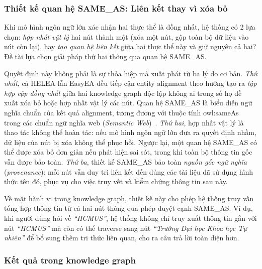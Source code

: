 \subsubsection{Thiết kế quan hệ SAME\_AS: Liên kết thay vì xóa bỏ}
\label{subsubsec:sameas-design}

Khi mô hình ngôn ngữ lớn xác nhận hai thực thể là đồng nhất, hệ thống có 2 lựa chọn: \textit{hợp nhất vật lý}
hai nút thành một (xóa một nút, gộp toàn bộ dữ liệu vào nút còn lại),
hay \textit{tạo quan hệ liên kết} giữa hai thực thể này và giữ nguyên cả hai? Đề
tài lựa chọn giải pháp thứ hai thông qua quan hệ SAME\_AS.

Quyết định này không phải là sự thỏa hiệp mà xuất phát từ ba lý do cơ
bản. \textit{Thứ nhất}, cả HELEA lẫn EasyEA đều tiếp cận entity
alignment theo hướng tạo ra \textit{tập hợp cặp đồng nhất} giữa hai
knowledge graph độc lập không ai trong số họ đề xuất xóa bỏ hoặc
hợp nhất vật lý các nút. Quan hệ SAME\_AS là biểu diễn ngữ nghĩa
chuẩn của kết quả alignment, tương đương với thuộc tính
owl:sameAs trong các chuẩn ngữ nghĩa web (\textit{Semantic
Web})~\cite{owlsemweb2004}. \textit{Thứ hai}, hợp nhất vật lý là
thao tác không thể hoàn tác: nếu mô hình ngôn ngữ lớn đưa ra quyết
định nhầm, dữ liệu của nút bị xóa không thể phục hồi.
Ngược lại, một quan hệ SAME\_AS có thể được xóa bỏ đơn giản nếu phát
hiện sai sót, trong khi toàn bộ thông tin gốc vẫn được bảo toàn.
\textit{Thứ ba}, thiết kế SAME\_AS bảo toàn \textit{nguồn gốc ngữ
nghĩa} (\textit{provenance}): mỗi nút vẫn duy trì liên kết đến đúng
các tài liệu đã sử dụng hình thức tên đó, phục vụ cho việc truy vết
và kiểm chứng thông tin sau này.

Về mặt hành vi trong knowledge graph, thiết kế này cho phép hệ thống
truy vấn tổng hợp thông tin từ cả hai nút thông qua phép duyệt cạnh
SAME\_AS. Ví dụ, khi người dùng hỏi về \textit{``HCMUS''}, hệ thống
không chỉ truy xuất thông tin gắn với nút \textit{``HCMUS''} mà còn
có thể traverse sang nút \textit{``Trường Đại học Khoa học Tự nhiên''}
để bổ sung thêm tri thức liên quan, cho ra câu trả lời toàn diện hơn.

\subsubsection{Kết quả trong knowledge graph}
\label{subsubsec:kg-result}

